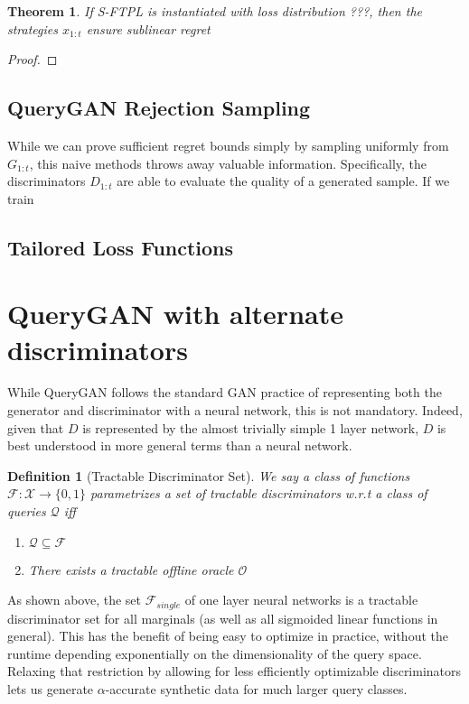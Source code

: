\documentclass[]{article}
\newcommand{\X}{\mathcal{X}}
\newcommand{\Q}{\mathcal{Q}}
\newcommand{\B}{\{0,1\}}
\newtheorem{definition}{Definition}[section]
\newtheorem{theorem}{Theorem}[section]
\theoremstyle{definition}
\begin{document}
    \begin{theorem}
        If S-FTPL is instantiated with loss distribution ???, then the strategies $x_{1:t}$ ensure sublinear regret
    \end{theorem}

    \begin{proof}
        
    \end{proof}

\subsection{QueryGAN Rejection Sampling}
While we can prove sufficient regret bounds simply by sampling uniformly from $G_{1:t}$, this naive methods throws away valuable information. Specifically, the discriminators $D_{1:t}$ are able to evaluate the quality of a generated sample. If we train 

\subsection{Tailored Loss Functions}

\section{QueryGAN with alternate discriminators}

While QueryGAN follows the standard GAN practice of representing both the generator and discriminator with a neural network, this is not mandatory. Indeed, given that $D$ is represented by the almost trivially simple 1 layer network, $D$ is best understood in more general terms than a neural network.

\begin{definition}[Tractable Discriminator Set]
    We say a class of functions $\mathcal{F}: \X \to \B$ parametrizes a set of tractable discriminators w.r.t a class of queries $\Q$ iff

    \begin{enumerate}
        \item $\Q \subseteq \mathcal{F}$
        \item There exists a tractable offline oracle $\mathcal{O}$ 
    \end{enumerate}
\end{definition}

As shown above, the set $\mathcal{F}_{single}$ of one layer neural networks is a tractable discriminator set for all marginals (as well as all sigmoided linear functions in general). This has the benefit of being easy to optimize in practice, without the runtime depending exponentially on the dimensionality of the query space. Relaxing that restriction by allowing for less efficiently optimizable discriminators lets us generate $\alpha$-accurate synthetic data for much larger query classes.
\end{document}
